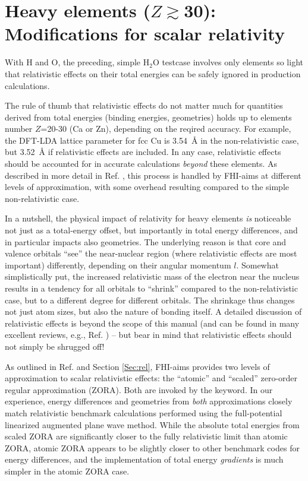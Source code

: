 \section{Heavy elements ($Z\gtrsim$30): Modifications for scalar relativity}
\label{Sec:rel-example}

With H and O, the preceding, simple H$_2$O testcase involves only
elements so light that relativistic effects on their total energies
can be safely ignored in production calculations. 

The rule of thumb that relativistic effects do not matter much for
quantities derived from total energies (binding energies, geometries)
holds up to elements number $Z$=20-30 (Ca or Zn), depending on the
reqired accuracy. For example, the DFT-LDA lattice parameter for fcc
Cu is 3.54~{\AA} in the non-relativistic case, but 3.52~{\AA} if
relativistic effects are included. In any case, relativistic effects
should be accounted for in accurate calculations \emph{beyond} these
elements. As described in more detail in Ref. \cite{Blum08}, this
process is handled by FHI-aims at different levels of approximation,
with some overhead resulting compared to the simple non-relativistic
case. 

In a nutshell, the physical impact of relativity for heavy elements
\emph{is} noticeable not just as a total-energy offset, but
importantly in total energy differences, and in particular impacts
also geometries. The underlying reason is that core and 
valence orbitals ``see'' the near-nuclear region (where relativistic
effects are most important) differently, depending on their 
angular momentum $l$. Somewhat simplistically put, the increased
relativistic mass of the electron near the nucleus results in a
tendency for all orbitals to ``shrink'' compared to the
non-relativistic case, but to a different degree for different
orbitals. The shrinkage thus changes not just atom sizes, but also the
nature of bonding itself. A detailed discussion of relativistic
effects is beyond the scope of this manual (and can be found in many
excellent reviews, e.g., Ref. \cite{Pyykko88}) -- but bear in mind
that relativistic effects should not simply be shrugged off!

As outlined in Ref. \cite{Blum08} and Section \ref{Sec:rel}, FHI-aims
provides two levels of approximation to scalar relativistic effects:
the ``atomic'' and ``scaled'' zero-order regular approximation
(ZORA). Both are invoked by the  keyword. In our
experience, energy differences and geometries from \emph{both}
approximations closely match relativistic benchmark calculations
performed using the full-potential linearized augmented plane wave
method. While the absolute total energies from scaled ZORA are
significantly closer to the fully relativistic limit than atomic
ZORA, atomic ZORA appears to be slightly closer to other benchmark
codes for energy differences, and the implementation of total energy 
\emph{gradients} is much simpler in the atomic ZORA case.

